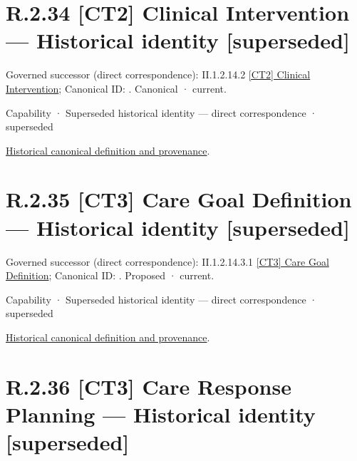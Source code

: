 \section*{R.2.34 [CT2] Clinical Intervention — Historical identity [superseded]}
\label{navigation:R.2.34}

{\small Governed successor (direct correspondence): II.1.2.14.2 \hyperref[element:5359d1b0ff814a0e871384469f5ebcd7]{[CT2] Clinical Intervention}; Canonical ID: \texttt{}. Canonical · current.}\par
\label{element:958345ee65f446d3b1259b8895ab100f}
{\small Capability · Superseded historical identity — direct correspondence · superseded}\par
\href{../../../../../../../continuum/strategy/capability/958345ee65f446d3b1259b8895ab100f.md}{Historical canonical definition and provenance}.\par
\section*{R.2.35 [CT3] Care Goal Definition — Historical identity [superseded]}
\label{navigation:R.2.35}

{\small Governed successor (direct correspondence): II.1.2.14.3.1 \hyperref[element:609e1bef516b44bb976b5dbebe7f684b]{[CT3] Care Goal Definition}; Canonical ID: \texttt{}. Proposed · current.}\par
\label{element:8bfbcc0a455d423c90ae2f1cfb732ca8}
{\small Capability · Superseded historical identity — direct correspondence · superseded}\par
\href{../../../../../../../continuum/strategy/capability/8bfbcc0a455d423c90ae2f1cfb732ca8.md}{Historical canonical definition and provenance}.\par
\section*{R.2.36 [CT3] Care Response Planning — Historical identity [superseded]}
\label{navigation:R.2.36}

